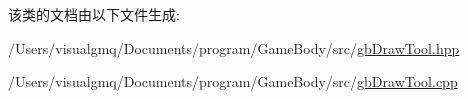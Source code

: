 该类的文档由以下文件生成\+:\begin{DoxyCompactItemize}
\item 
/\+Users/visualgmq/\+Documents/program/\+Game\+Body/src/\mbox{\hyperlink{gb_draw_tool_8hpp}{gb\+Draw\+Tool.\+hpp}}\item 
/\+Users/visualgmq/\+Documents/program/\+Game\+Body/src/\mbox{\hyperlink{gb_draw_tool_8cpp}{gb\+Draw\+Tool.\+cpp}}\end{DoxyCompactItemize}
